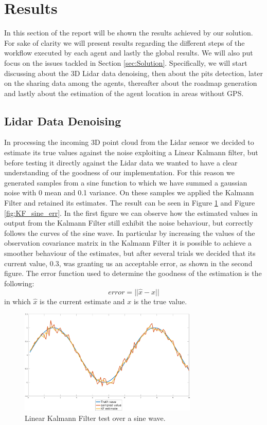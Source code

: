 \documentclass[twocolumn, a4paper]{article}
\begin{document}
\section{Results}
In this section of the report will be shown the results achieved by our
solution. For sake of clarity we will present results regarding the different
steps of the workflow executed by each agent and lastly the global results.
We will also put focus on the issues tackled in Section \ref{sec:Solution}.
Specifically, we will start discussing about the 3D Lidar data denoising, then
about the pits detection, later on the sharing data among the agents,
thereafter about the roadmap generation and lastly about the estimation
of the agent location in areas without GPS.
\subsection{Lidar Data Denoising}
In processing the incoming 3D point cloud from the Lidar sensor we decided
to estimate its true values against the noise exploiting a Linear Kalmann
filter, but before testing it directly against the Lidar data we wanted to
have a clear understanding of the goodness of our implementation. For this
reason we generated samples from a sine function to which we have summed
a gaussian noise with 0 mean and 0.1 variance. On these samples we applied
the Kalmann Filter and retained its estimates. The result can be seen in
Figure \ref{fig:KF_sine} and Figure \ref{fig:KF_sine_err}. In the first
figure we can observe how the estimated values in output from the Kalmann
Filter still exhibit the noise behaviour, but correctly follows the
curves of the sine wave. In particular by increasing the values of the 
observation covariance matrix in the Kalmann Filter it
is possible to achieve a 
smoother behaviour of the estimates, but after several trials we decided
that its current value, 0.3, was granting us an acceptable error, as shown
in the second figure. The error function used to determine the goodness
of the estimation is the following:
\begin{equation}
    error = ||\hat{x} - x||
\end{equation}
in which $\hat{x}$ is the current estimate and $x$ is the true value.
\begin{figure}[h]
    \centering
    \includegraphics[width=8.5cm]{"../Report_images/Denoising_KF_sine"}
    \caption{Linear Kalmann Filter test over a sine wave.}
    \label{fig:KF_sine}
\end{figure}
\end{document}
